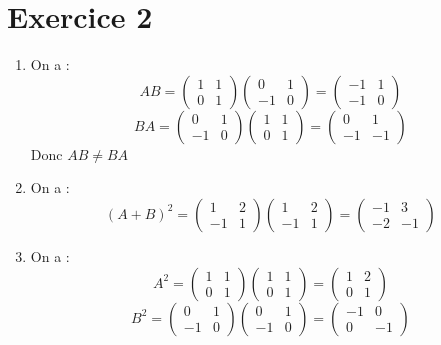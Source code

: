 \documentclass[a4paper, titlepage]{article}
\begin{document}
	\section*{Exercice 2}
	\begin{enumerate}
		\item On a :
			$$ AB = \begin{pmatrix} 1&1\\0&1 \end{pmatrix} \begin{pmatrix} 0&1\\-1&0 \end{pmatrix} = \begin{pmatrix} -1&1\\-1&0 \end{pmatrix}  $$
			$$ BA =  \begin{pmatrix} 0&1\\-1&0 \end{pmatrix} \begin{pmatrix} 1&1\\0&1 \end{pmatrix}= \begin{pmatrix} 0&1\\-1&-1 \end{pmatrix}  $$
			Donc $AB \neq BA$
		\item On a :
			$$ (A + B)^2 = \begin{pmatrix} 1&2\\-1&1 \end{pmatrix} \begin{pmatrix} 1&2\\-1&1 \end{pmatrix} = \begin{pmatrix} -1&3\\-2&-1 \end{pmatrix}  $$
		\item On a :
			$$ A^2 = \begin{pmatrix} 1&1\\0&1 \end{pmatrix} \begin{pmatrix} 1&1\\0&1 \end{pmatrix} = \begin{pmatrix} 1&2\\0&1 \end{pmatrix} $$
			$$ B^2 = \begin{pmatrix} 0&1\\-1&0 \end{pmatrix} \begin{pmatrix} 0&1\\-1&0 \end{pmatrix} = \begin{pmatrix} -1&0\\0&-1 \end{pmatrix}  $$

\end{enumerate}
\end{document}
